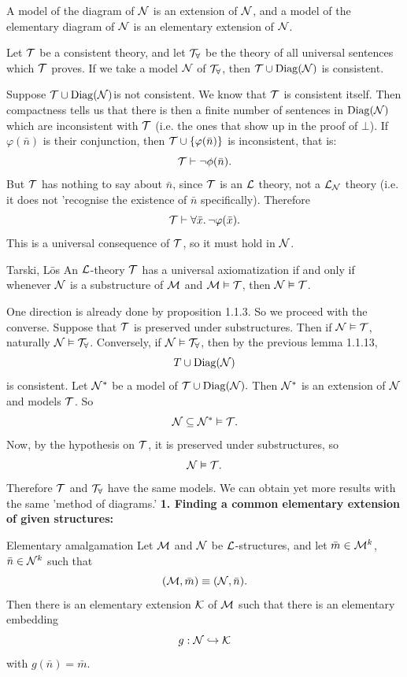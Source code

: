 \documentclass{article}
\numberwithin{thm}{subsection}
\begin{document}
A model of the diagram of $\mathcal{N}$ is an extension of $\mathcal{N}$, and a model of the elementary diagram of $\mathcal{N}$ is an elementary extension of $\mathcal{N}$.
\begin{fancylem}{} Let $\mathcal{T}$ be a consistent theory, and let $\mathcal{T}_{\forall}$ be the theory of all universal sentences which $\mathcal{T}$ proves. If we take a model $\mathcal{N}$ of $\mathcal{T}_{\forall}$, then $\mathcal{T} \cup \operatorname{Diag}(\mathcal{N})$ is consistent.
\end{fancylem}
\proof Suppose $\mathcal{T} \cup \operatorname{Diag}(\mathcal{N})$is not consistent. We know that $\mathcal{T}$ is consistent itself. Then compactness tells us that there is then a finite number of sentences in $\operatorname{Diag}(\mathcal{N})$ which are inconsistent with $\mathcal{T}$ (i.e. the ones that show up in the proof of $\bot$). \gap If $\varphi(\bar n)$ is their conjunction, then $\mathcal{T} \cup \{ \varphi(\bar n) \}$ is inconsistent, that is: \[ \mathcal{T} \vdash \neg \phi(\bar n).\]
But $\mathcal{T}$ has nothing to say about $\bar n$, since $\mathcal{T}$ is an $\mathcal{L}$ theory, not a $\mathcal{L}_{\mathcal{N}}$ theory (i.e. it does not 'recognise the existence of $\bar n$ specifically). Therefore \[ \mathcal{T} \vdash \forall \bar x.\, \neg \varphi (\bar x).\] This is a universal consequence of $\mathcal{T}$, so it must hold in $\mathcal{N}$. \endproof
\begin{fancythm}{Tarski, L\=os}
An $\mathcal{L}$-theory $\mathcal{T}$ has a universal axiomatization if and only if whenever $\mathcal{N}$ is a substructure of $\mathcal{M}$ and $\mathcal{M} \vDash \mathcal{T}$, then $\mathcal{N} \vDash \mathcal{T}$.
\end{fancythm}
\proof One direction is already done by proposition 1.1.3. So we proceed with the converse. \gap Suppose that $\mathcal{T}$ is preserved under substructures. Then if $\mathcal{N} \vDash \mathcal{T}$, naturally $\mathcal{N} \vDash \mathcal{T}_{\forall}$. \gap Conversely, if $\mathcal{N} \vDash \mathcal{T}_{\forall}$, then by the previous lemma 1.1.13, \[ T \cup \operatorname{Diag}(\mathcal{N})\] is consistent. Let $\mathcal{N}^{*}$ be a model of $\mathcal{T} \cup \operatorname{Diag}(\mathcal{N}).$ Then $\mathcal{N}^{*}$ is an extension of $\mathcal{N}$ and models $\mathcal{T}$. So \[ \mathcal{N} \subseteq \mathcal{N}^{*} \vDash \mathcal{T}. \]
Now, by the hypothesis on $\mathcal{T}$, it is preserved under substructures, so \[ \mathcal{N} \vDash \mathcal{T}.\] Therefore $\mathcal{T}$ and $\mathcal{T}_{\forall}$ have the same models.
\endproof
We can obtain yet more results with the same 'method of diagrams.' \gap
\textbf{1. Finding a common elementary extension of given structures:} \gap
\begin{fancythm}{Elementary amalgamation}
    Let $\mathcal{M}$ and $\mathcal{N}$ be $\mathcal{L}$-structures, and let $\bar m \in \mathcal{M}^{k}$, $\bar n \in \mathcal{N}^{k}$ such that \[ (\mathcal{M},\bar m) \equiv (\mathcal{N}, \bar n).\] Then there is an elementary extension $\mathcal{K}$ of $\mathcal{M}$ such that there is an elementary embedding \[
        g : \mathcal{N} \hookrightarrow \mathcal{K}
    \]
    with $g(\bar n) = \bar m$.
\end{fancythm}
\end{document}
